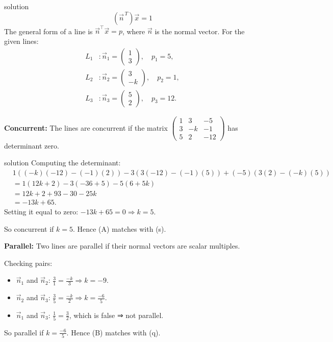 \documentclass{beamer}
\begin{document}
\begin{frame}{solution}
\[
\left(\vec{n}^{\,T}\right)\vec{x} = 1
\]
The general form of a line is $\vec{n}^\top \vec{x} = p$, where $\vec{n}$ is the normal vector.
For the given lines:
\begin{align*}
L_1 &: \vec{n}_1 = \begin{pmatrix} 1 \\ 3 \end{pmatrix}, \quad p_1 = 5, \\
L_2 &: \vec{n}_2 = \begin{pmatrix} 3 \\ -k \end{pmatrix}, \quad p_2 = 1, \\
L_3 &: \vec{n}_3 = \begin{pmatrix} 5 \\ 2 \end{pmatrix}, \quad p_3 = 12.
\end{align*}
    \item \textbf{Concurrent:} The lines are concurrent if the matrix
    $\begin{pmatrix} 1 & 3 & -5 \\ 3 & -k & -1 \\ 5 & 2 & -12 \end{pmatrix}$
    has determinant zero.
\end{frame}
\begin{frame}{solution}
 Computing the determinant:
    \begin{align*}
    &1((-k)(-12) - (-1)(2)) - 3(3(-12) - (-1)(5)) + (-5)(3(2) - (-k)(5)) \\
    &= 1(12k + 2) - 3(-36 + 5) - 5(6 + 5k) \\
    &= 12k + 2 + 93 - 30 - 25k \\
    &= -13k + 65.
    \end{align*}
    Setting it equal to zero: $-13k + 65 = 0 \Rightarrow k = 5$.

    So concurrent if $k = 5$. Hence (A) matches with (s).

    \item \textbf{Parallel:} Two lines are parallel if their normal vectors are scalar multiples.

    Checking pairs:

    \begin{itemize}
        \item $\vec{n}_1$ and $\vec{n}_2$: $\frac{3}{1} = \frac{-k}{3} \Rightarrow k = -9$.

        \item $\vec{n}_2$ and $\vec{n}_3$: $\frac{3}{5} = \frac{-k}{2} \Rightarrow k = \frac{-6}{5}$.

        \item $\vec{n}_1$ and $\vec{n}_3$: $\frac{1}{5} = \frac{3}{2}$, which is false ⇒ not parallel.
    \end{itemize}

    So parallel if $k = \frac{-6}{5}$. Hence (B) matches with (q).

\end{frame}
\end{document}
